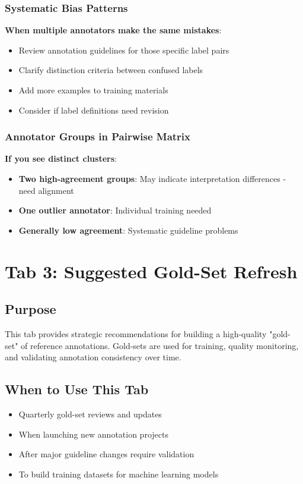 \documentclass[11pt]{article}
\begin{document}
\subsubsection{Systematic Bias Patterns}
\textbf{When multiple annotators make the same mistakes}:
\begin{itemize}
\item Review annotation guidelines for those specific label pairs
\item Clarify distinction criteria between confused labels
\item Add more examples to training materials
\item Consider if label definitions need revision
\end{itemize}

\subsubsection{Annotator Groups in Pairwise Matrix}
\textbf{If you see distinct clusters}:
\begin{itemize}
\item \textbf{Two high-agreement groups}: May indicate interpretation differences - need alignment
\item \textbf{One outlier annotator}: Individual training needed
\item \textbf{Generally low agreement}: Systematic guideline problems
\end{itemize}

\section{Tab 3: Suggested Gold-Set Refresh}

\subsection{Purpose}
This tab provides strategic recommendations for building a high-quality "gold-set" of reference annotations. Gold-sets are used for training, quality monitoring, and validating annotation consistency over time.

\subsection{When to Use This Tab}
\begin{itemize}
\item Quarterly gold-set reviews and updates
\item When launching new annotation projects
\item After major guideline changes require validation
\item To build training datasets for machine learning models
\end{itemize}
\end{document}
